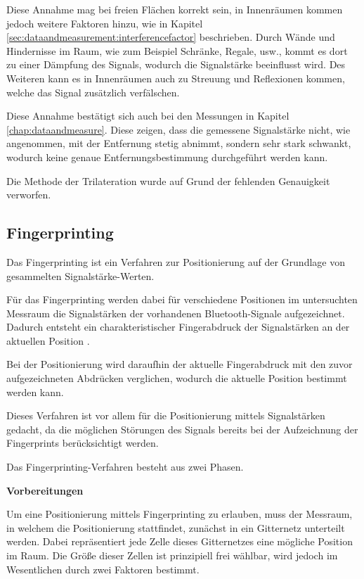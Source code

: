 Diese Annahme mag bei freien Flächen korrekt sein, in Innenräumen kommen jedoch weitere Faktoren hinzu, wie in Kapitel \ref{sec:dataandmeasurement:interferencefactor} beschrieben. 
Durch Wände und Hindernisse im Raum, wie zum Beispiel Schränke, Regale, usw., kommt es dort zu einer Dämpfung des Signals, wodurch die Signalstärke beeinflusst wird. Des Weiteren kann es in Innenräumen auch zu Streuung und Reflexionen kommen, welche das Signal zusätzlich verfälschen.

Diese Annahme bestätigt sich auch bei den Messungen in Kapitel \ref{chap:dataandmeasure}. Diese zeigen, dass die gemessene Signalstärke nicht, wie angenommen, mit der Entfernung stetig abnimmt, sondern sehr stark schwankt, wodurch keine genaue Entfernungsbestimmung durchgeführt werden kann.

Die Methode der Trilateration wurde auf Grund der fehlenden Genauigkeit verworfen. 

\subsection{Fingerprinting}
\label{sec:implementation:positioning:fingerprinting}
Das Fingerprinting ist ein Verfahren zur Positionierung auf der Grundlage von gesammelten Signalstärke-Werten.

Für das Fingerprinting werden dabei für verschiedene Positionen im untersuchten Messraum die Signalstärken der vorhandenen Bluetooth-Signale aufgezeichnet. 
Dadurch entsteht ein charakteristischer Fingerabdruck der Signalstärken an der aktuellen Position \cite{wififingerprinting}.

Bei der Positionierung wird daraufhin der aktuelle Fingerabdruck mit den zuvor aufgezeichneten Abdrücken verglichen, wodurch die aktuelle Position bestimmt werden kann.

Dieses Verfahren ist vor allem für die Positionierung mittels Signalstärken gedacht, da die möglichen Störungen des Signals bereits bei der Aufzeichnung der Fingerprints berücksichtigt werden.

Das Fingerprinting-Verfahren besteht aus zwei Phasen.


\textbf{Vorbereitungen}

Um eine Positionierung mittels Fingerprinting zu erlauben, muss der Messraum, in welchem die Positionierung stattfindet, zunächst in ein Gitternetz unterteilt werden. Dabei repräsentiert jede Zelle dieses Gitternetzes eine mögliche Position im Raum.
Die Größe dieser Zellen ist prinzipiell frei wählbar, wird jedoch im Wesentlichen durch zwei Faktoren bestimmt. 

